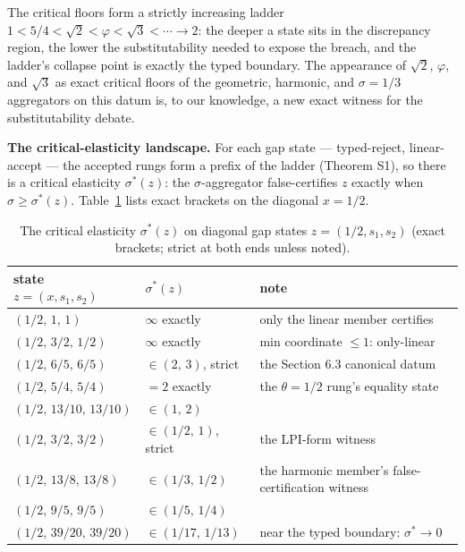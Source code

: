 \documentclass[3p,11pt]{elsarticle}
\begin{document}
The critical floors form a strictly increasing ladder
\(1 < 5/4 < \sqrt{2} < \varphi < \sqrt{3} < \cdots \to 2\): the
deeper a state sits in the discrepancy region, the lower the
substitutability needed to expose the breach, and the ladder's collapse
point is exactly the typed boundary. The appearance of \(\sqrt{2}\),
\(\varphi\), and \(\sqrt{3}\) as exact critical floors of the
geometric, harmonic, and \(\sigma = 1/3\) aggregators on this datum
is, to our knowledge, a new exact witness for the substitutability
debate.

\textbf{The critical-elasticity landscape.} For each gap state ---
typed-reject, linear-accept --- the accepted rungs form a prefix of the
ladder (Theorem S1), so there is a critical elasticity \(\sigma^*(z)\):
the \(\sigma\)-aggregator false-certifies \(z\) exactly when
\(\sigma \ge \sigma^*(z)\). Table~\ref{tab:sigmastar} lists exact
brackets on the diagonal \(x = 1/2\).

\begin{table}[htbp]
\centering
\small
\caption{The critical elasticity \(\sigma^*(z)\) on diagonal gap
states \(z = (1/2, s_1, s_2)\) (exact brackets; strict at both ends
unless noted).}
\label{tab:sigmastar}
\begin{tabular}{@{}llp{5.3cm}@{}}
\toprule
state \(z = (x, s_1, s_2)\) & \(\sigma^*(z)\) & note \\
\midrule
\((1/2,\, 1,\, 1)\) & \(\infty\) exactly & only the linear member certifies \\
\((1/2,\, 3/2,\, 1/2)\) & \(\infty\) exactly & min coordinate \(\le 1\): only-linear \\
\((1/2,\, 6/5,\, 6/5)\) & \(\in (2,\, 3)\), strict & the Section 6.3 canonical datum \\
\((1/2,\, 5/4,\, 5/4)\) & \(= 2\) exactly & the \(\theta = 1/2\) rung's equality state \\
\((1/2,\, 13/10,\, 13/10)\) & \(\in (1,\, 2)\) & \\
\((1/2,\, 3/2,\, 3/2)\) & \(\in (1/2,\, 1)\), strict & the LPI-form witness \\
\((1/2,\, 13/8,\, 13/8)\) & \(\in (1/3,\, 1/2)\) & the harmonic member's false-certification witness \\
\((1/2,\, 9/5,\, 9/5)\) & \(\in (1/5,\, 1/4)\) & \\
\((1/2,\, 39/20,\, 39/20)\) & \(\in (1/17,\, 1/13)\) & near the typed boundary: \(\sigma^* \to 0\) \\
\bottomrule
\end{tabular}
\end{table}
\end{document}
